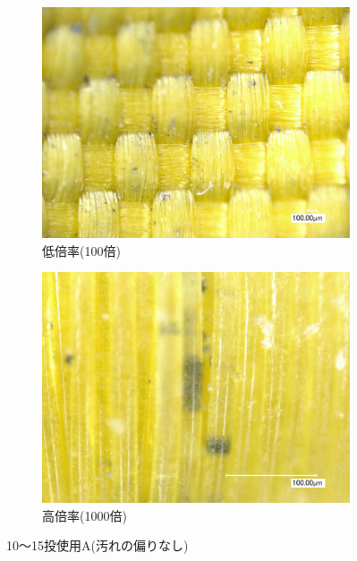 \documentclass[main]{subfiles}
\begin{document}
\begin{figure}[H]
    \centering
    \begin{subfigure}[htbp]{0.45\linewidth}
        \centering
        \includegraphics[keepaspectratio, width=0.8\linewidth]{figures/縁/カーリングパッド10-15低倍率.jpg}
        \caption{低倍率(100倍)}
        \label{fig:label}
    \end{subfigure}
    \begin{subfigure}[htbp]{0.45\linewidth}
        \centering
        \includegraphics[keepaspectratio, width=0.8\linewidth]{figures/縁/カーリングパッド10-15.jpg}
        \caption{高倍率(1000倍)}
        \label{fig:label}
    \end{subfigure}
    \caption{10～15投使用A(汚れの偏りなし)}
    \label{fig:2}
\end{figure}
    
\end{document}
